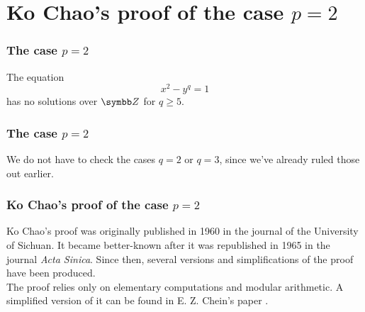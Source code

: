\section{Ko Chao's proof of the case \texorpdfstring{\(p = 2\)}{p = 3}}

\begin{frame}
\frametitle{The case \texorpdfstring{\(p = 2\)}{p = 2}}

\begin{theorem}[Ko Chao, 1965]
The equation
\[
    x^2 - y^q = 1
\]
has no solutions over \(\integers\) for \(q \geq 5\).
\end{theorem}
\end{frame}

\begin{frame}
\frametitle{The case \texorpdfstring{\(p = 2\)}{p = 2}}

\begin{remark}
We do not have to check the cases \(q = 2\) or \(q = 3\), since we've already ruled those out earlier.
\end{remark}
\end{frame}

\begin{frame}
\frametitle{Ko Chao's proof of the case \texorpdfstring{\(p = 2\)}{p = 2}}

Ko Chao's proof was originally published in 1960 in the journal of the University of Sichuan. It became better-known after it was republished in 1965 in the journal \emph{Acta Sinica}. Since then, several versions and simplifications of the proof have been produced. \\[1em]

The proof relies only on elementary computations and modular arithmetic. A simplified version of it can be found in E. Z. Chein's paper \cite{Chein1976}.
\end{frame}
